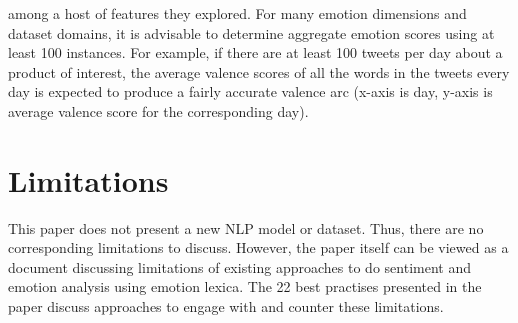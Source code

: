 \documentclass[11pt]{article}
\begin{document}
\begin{enumerate}[label=\alph*.]
among a host of features they explored. For many emotion dimensions and dataset domains, it is advisable to determine aggregate emotion scores using at least 100 instances. For example, if there are at least 100 tweets per day about a product of interest, the average valence scores of all the words in the tweets every day is expected to produce a fairly accurate valence arc (x-axis is day, y-axis is average valence score for the corresponding day). 

\end{enumerate}





\section{Limitations}
This paper does not present a new NLP model or dataset. Thus, there are no corresponding limitations to discuss. 
However, the paper itself can be viewed as a document discussing limitations of existing approaches to do sentiment and emotion analysis using emotion lexica. The 22 best practises presented in the paper 
discuss approaches to engage with and counter these limitations.
\end{document}
